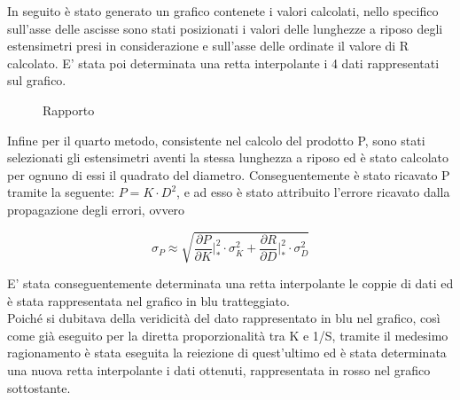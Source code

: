 \documentclass[a4paper,11pt,oneside]{article}
\begin{document}
In seguito è stato generato un grafico contenete i valori calcolati, nello specifico sull'asse delle ascisse sono stati posizionati i valori delle lunghezze a riposo degli estensimetri presi in considerazione e sull'asse delle ordinate il valore di R calcolato. E' stata poi determinata una retta interpolante i 4 dati rappresentati sul grafico.


\begin{figure}[h!]
    \centering
        \label{fig:rapporto}
        \caption{Rapporto}
\end{figure}


Infine per il quarto metodo, consistente nel calcolo del prodotto P, sono stati selezionati gli estensimetri aventi la stessa lunghezza a riposo ed è stato calcolato per ognuno di essi il quadrato del diametro. Conseguentemente è stato ricavato P tramite la seguente: $P= K \cdot D^2 $, e ad esso è stato attribuito l'errore ricavato dalla propagazione degli errori, ovvero 

\begin{equation*}
    \sigma_P \approx \sqrt{\frac{\partial P }{\partial K} \Big|_{\ast}^2 \cdot 
    \sigma_K^2 +  \frac{\partial R }{\partial D}\Big|_{\ast}^2 \cdot \sigma_D^2 }
\end{equation*}

E' stata conseguentemente determinata una retta interpolante le coppie di dati ed è stata rappresentata nel grafico in blu tratteggiato.\\
Poiché si dubitava della veridicità del dato rappresentato in blu nel grafico, così come già eseguito per la diretta proporzionalità tra K e 1/S, tramite il medesimo ragionamento è stata eseguita la reiezione di quest'ultimo ed è stata determinata una nuova retta interpolante i dati ottenuti, rappresentata in rosso nel grafico sottostante.
\end{document}
